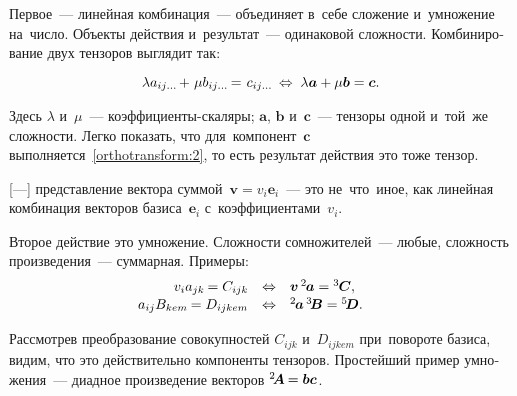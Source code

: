 \begin{otherlanguage}{russian}

Первое~--- линейная комбинация~--- объединяет в~себе сложение и~умножение на~число. Объекты действия и~результат~--- одинаковой сложности. Комбинирование двух тензоров выглядит так:

\nopagebreak\vspace{-0.2em}\begin{equation}\label{action:1}
\lambda a_{ij\ldots} \hspace{-0.2ex} + \hspace{0.2ex} \mu b_{ij\ldots} \hspace{-0.2ex} = \hspace{0.2ex} c_{ij\ldots} \hspace{-0.2ex} \;\Leftrightarrow\; \lambda \bm{a} + \mu \bm{b} = \bm{c}.
\end{equation}

\vspace{-0.2em} \noindent Здесь $\lambda$ и~$\mu$~--- коэффициенты\hbox{-}скаляры; $\bm{a}$, $\bm{b}$ и~$\bm{c}$~--- тензоры одной и~той~же сложности. Легко показать, что для~компонент~$\bm{c}$ выполняется~\eqref{orthotransform:2}, то есть результат действия это тоже тензор.

[---] представление вектора суммой~${\bm{v} = v_i \bm{e}_i}$~--- это не~что~иное, как линейная комбинация векторов базиса~${\bm{e}_i}$ с~коэффициентами~${v_i}$.

Второе действие это умножение. Сложности сомножителей~--- любые, сложность произведения~--- суммарная. Примеры:
\begin{equation}\label{action:2}
\begin{array}{rcl}
v_i a_{jk} \hspace{-0.16ex} = C_{ijk} & \Leftrightarrow & \bm{v} \, {^2\hspace{-0.2ex}\bm{a}} = {^3\!\!\;\bm{C}},\\[0.1em]
a_{ij} B_{kem} \hspace{-0.16ex} = D_{ijkem} & \Leftrightarrow & {^2\hspace{-0.2ex}\bm{a}} \, {^3\!\!\,\bm{B}} = {^5\!\!\,\bm{D}}.
\end{array}\hspace{1.5em}
\end{equation}

\vspace{-0.1em} Рассмотрев преобразование совокупностей ${C_{ijk}}$ и~${D_{ijkem}}$ при~повороте базиса, видим, что это действительно компоненты тензоров. Простейший пример умножения~--- диадное произведение векторов ${^2\hspace{-0.2em}\bm{A} \hspace{-0.15ex} = \bm{b}\bm{c}}$.


\end{otherlanguage}
